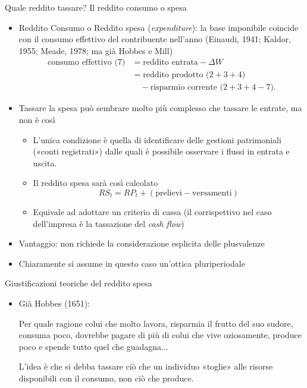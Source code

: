 \documentclass[aspectratio=64,12pt]{beamer}
\newcommand\€{\,\text{€}}
\begin{document}
\begin{frame}{Quale reddito tassare? Il reddito consumo o spesa}
\begin{itemize}
\item \alert{Reddito Consumo} o \alert{Reddito spesa} (\emph{expenditure}): la base imponibile
coincide con il consumo effettivo del contribuente nell'anno (Einaudi, 1941;
Kaldor, 1955; Meade, 1978; ma già Hobbes e Mill)
\begin{equation*}\label{eq:redconsumo}
\begin{split}
\text{consumo effettivo (7)} &=\text{reddito entrata} - \Delta W\\
&=\text{reddito prodotto ($2+3+4$)}\\
&\quad{}-\text{risparmio corrente ($2+3+4-7$)}.    
\end{split}
\end{equation*}
\item Tassare la spesa può sembrare molto più complesso che tassare le entrate, ma
non è così
\begin{itemize}
\item L'unica condizione è quella di identificare delle gestioni patrimoniali
(«conti registrati») dalle quali è possibile osservare i flussi in entrata
e uscita.
\item Il reddito spesa sarà così calcolato
\begin{equation*}
 RS_{t}=RP_{t} + (\text{prelievi} - \text{versamenti})
\end{equation*}
\item Equivale ad adottare un criterio di cassa (il corrispettivo nel caso
dell'impresa è la tassazione del \emph{cash flow})
\end{itemize}
\item Vantaggio: non richiede la considerazione esplicita delle plusvalenze
\item Chiaramente si assume in questo caso un'ottica \alert{pluriperiodale}
\end{itemize}
\end{frame}


\begin{frame}{Giustificazioni teoriche del reddito spesa}
\begin{itemize}
\item Già Hobbes (1651):
\begin{quoting}\small
   Per quale ragione colui che molto lavora, risparmia il frutto del suo 
   sudore, consuma poco, dovrebbe pagare di più di colui che vive
   oziosamente, produce poco e spende tutto quel che guadagna...
\end{quoting}
L'idea è che si debba tassare ciò che un individuo «toglie» alle risorse
disponibili con il consumo, non ciò che produce.
\end{itemize}
\end{frame}
\end{document}
